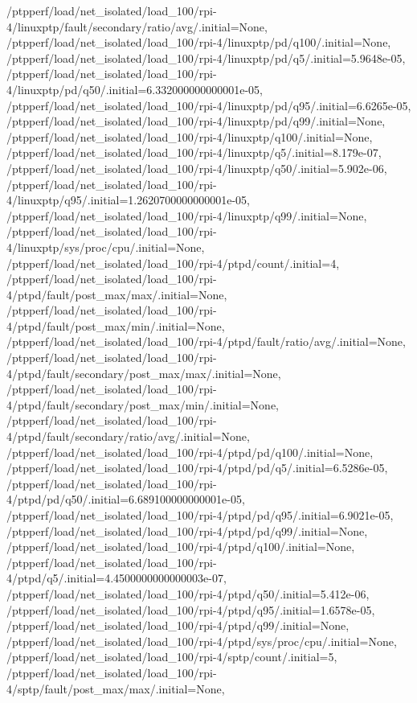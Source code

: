 {    /ptpperf/load/net_isolated/load_100/rpi-4/linuxptp/fault/secondary/ratio/avg/.initial=None,
    /ptpperf/load/net_isolated/load_100/rpi-4/linuxptp/pd/q100/.initial=None,
    /ptpperf/load/net_isolated/load_100/rpi-4/linuxptp/pd/q5/.initial=5.9648e-05,
    /ptpperf/load/net_isolated/load_100/rpi-4/linuxptp/pd/q50/.initial=6.332000000000001e-05,
    /ptpperf/load/net_isolated/load_100/rpi-4/linuxptp/pd/q95/.initial=6.6265e-05,
    /ptpperf/load/net_isolated/load_100/rpi-4/linuxptp/pd/q99/.initial=None,
    /ptpperf/load/net_isolated/load_100/rpi-4/linuxptp/q100/.initial=None,
    /ptpperf/load/net_isolated/load_100/rpi-4/linuxptp/q5/.initial=8.179e-07,
    /ptpperf/load/net_isolated/load_100/rpi-4/linuxptp/q50/.initial=5.902e-06,
    /ptpperf/load/net_isolated/load_100/rpi-4/linuxptp/q95/.initial=1.2620700000000001e-05,
    /ptpperf/load/net_isolated/load_100/rpi-4/linuxptp/q99/.initial=None,
    /ptpperf/load/net_isolated/load_100/rpi-4/linuxptp/sys/proc/cpu/.initial=None,
    /ptpperf/load/net_isolated/load_100/rpi-4/ptpd/count/.initial=4,
    /ptpperf/load/net_isolated/load_100/rpi-4/ptpd/fault/post_max/max/.initial=None,
    /ptpperf/load/net_isolated/load_100/rpi-4/ptpd/fault/post_max/min/.initial=None,
    /ptpperf/load/net_isolated/load_100/rpi-4/ptpd/fault/ratio/avg/.initial=None,
    /ptpperf/load/net_isolated/load_100/rpi-4/ptpd/fault/secondary/post_max/max/.initial=None,
    /ptpperf/load/net_isolated/load_100/rpi-4/ptpd/fault/secondary/post_max/min/.initial=None,
    /ptpperf/load/net_isolated/load_100/rpi-4/ptpd/fault/secondary/ratio/avg/.initial=None,
    /ptpperf/load/net_isolated/load_100/rpi-4/ptpd/pd/q100/.initial=None,
    /ptpperf/load/net_isolated/load_100/rpi-4/ptpd/pd/q5/.initial=6.5286e-05,
    /ptpperf/load/net_isolated/load_100/rpi-4/ptpd/pd/q50/.initial=6.689100000000001e-05,
    /ptpperf/load/net_isolated/load_100/rpi-4/ptpd/pd/q95/.initial=6.9021e-05,
    /ptpperf/load/net_isolated/load_100/rpi-4/ptpd/pd/q99/.initial=None,
    /ptpperf/load/net_isolated/load_100/rpi-4/ptpd/q100/.initial=None,
    /ptpperf/load/net_isolated/load_100/rpi-4/ptpd/q5/.initial=4.4500000000000003e-07,
    /ptpperf/load/net_isolated/load_100/rpi-4/ptpd/q50/.initial=5.412e-06,
    /ptpperf/load/net_isolated/load_100/rpi-4/ptpd/q95/.initial=1.6578e-05,
    /ptpperf/load/net_isolated/load_100/rpi-4/ptpd/q99/.initial=None,
    /ptpperf/load/net_isolated/load_100/rpi-4/ptpd/sys/proc/cpu/.initial=None,
    /ptpperf/load/net_isolated/load_100/rpi-4/sptp/count/.initial=5,
    /ptpperf/load/net_isolated/load_100/rpi-4/sptp/fault/post_max/max/.initial=None,
}
